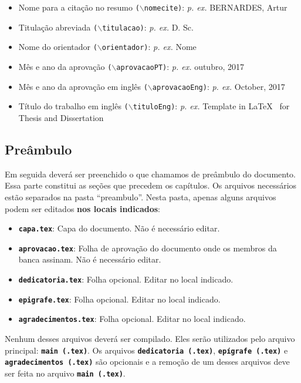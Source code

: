 \documentclass{article}
\begin{document}
 \begin{itemize}
  \item Nome para a citação no resumo \texttt{($\backslash$nomecite)}: \textit{p. ex.} BERNARDES, Artur
   \item Titulação abreviada \texttt{($\backslash$titulacao)}: \textit{p. ex.} D. Sc.
   \item Nome do orientador \texttt{($\backslash$orientador)}: \textit{p. ex.} Nome
   \item Mês e ano da aprovação \texttt{($\backslash$aprovacaoPT)}: \textit{p. ex.} outubro, 2017
   \item Mês e ano da aprovação em inglês \texttt{($\backslash$aprovacaoEng)}: \textit{p. ex.} October, 2017
   \item Título do trabalho em inglês \texttt{($\backslash$tituloEng)}: \textit{p. ex.} Template in \LaTeX~ for Thesis and Dissertation
 \end{itemize}


\subsection{Preâmbulo}

Em seguida deverá ser preenchido o que chamamos de preâmbulo do documento. Essa parte constitui as seções que precedem os capítulos. Os arquivos necessários estão separados na pasta ``preambulo''. Nesta pasta, apenas alguns arquivos podem ser editados \textbf{nos locais indicados}:

\begin{itemize}
 \item \texttt{\textbf{capa.tex}}: Capa do documento. Não é necessário editar.
 \item \texttt{\textbf{aprovacao.tex}}: Folha de aprovação do documento onde os membros da banca assinam. Não é necessário editar.
 \item \texttt{\textbf{dedicatoria.tex}}: Folha opcional. Editar no local indicado.
 \item \texttt{\textbf{epigrafe.tex}}: Folha opcional. Editar no local indicado.
 \item \texttt{\textbf{agradecimentos.tex}}: Folha opcional. Editar no local indicado.
\end{itemize}

Nenhum desses arquivos deverá ser compilado. Eles serão utilizados pelo arquivo principal: \texttt{\textbf{main (.tex)}}. Os arquivos \texttt{\textbf{dedicatoria (.tex)}}, \texttt{\textbf{epígrafe (.tex)}} e \texttt{\textbf{agradecimentos (.tex)}} são opcionais e a remoção de um desses arquivos deve ser feita no arquivo \texttt{\textbf{main (.tex)}}.
\end{document}
